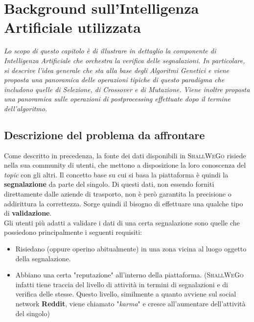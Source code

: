 \chapter{Background sull'Intelligenza Artificiale utilizzata} %
%

\begin{citazione}
    \textit{Lo scopo di questo capitolo è di illustrare in dettaglio la componente di Intelligenza Artificiale che orchestra la verifica delle segnalazioni. In particolare, si descrive l'idea generale che sta alla base degli Algoritmi Genetici e viene proposta una panoramica delle operazioni tipiche di questo paradigma che includono quelle di Selezione, di Crossover e di Mutazione. Viene inoltre proposta una panoramica sulle operazioni di postprocessing effettuate dopo il termine dell'algoritmo.}
\end{citazione}

\newpage

\section{Descrizione del problema da affrontare}
    Come descritto in precedenza, la fonte dei dati disponibili in \textsc{ShallWeGo} risiede nella sua community di utenti, che mettono a disposizione la loro conoscenza del \textit{topic} con gli altri. Il concetto base su cui si basa la piattaforma è quindi la \textbf{segnalazione} da parte del singolo. Di questi dati, non essendo forniti direttamente dalle aziende di trasporto, non è però garantita la precisione o addirittura la correttezza. Sorge quindi il bisogno di effettuare una qualche tipo di \textbf{validazione}. \\
    Gli utenti più adatti a validare i dati di una certa segnalazione sono quelle che possiedono principalmente i seguenti requisiti:
    \begin{itemize}
        \item Risiedano (oppure operino abitualmente) in una zona vicina al luogo oggetto della segnalazione.
        \item Abbiano una certa "reputazione" all'interno della piattaforma. (\textsc{ShallWeGo} infatti tiene traccia del livello di attività in termini di segnalazioni e di verifica delle stesse. Questo livello, similmente a quanto avviene sul social network \textbf{Reddit}, viene chiamato "\textit{karma}" e cresce all'aumentare dell'attività del singolo)
    \end{itemize}

